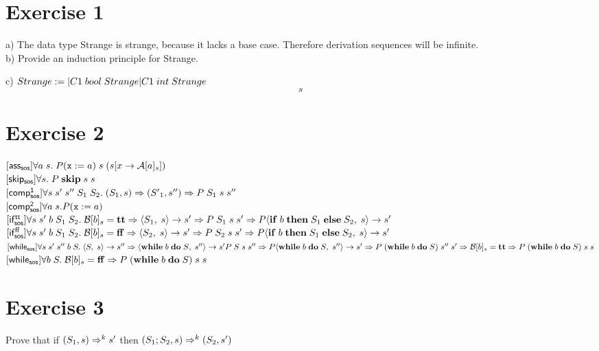 \documentclass[a4paper]{paper}
\begin{document}
\section*{Exercise 1}

a) The data type Strange is strange, because it lacks a base case. Therefore derivation sequences will be infinite. \\

b) Provide an induction principle for Strange.

c)
$Strange :=\\
| C1\;bool\;Strange\\
| C1\;int\;Strange\\
$
$$s$$

\section*{Exercise 2}


$\rasssos \forall a\;s.\;P(\cass x a)\;s\;(s[x \rightarrow \aeval a s])$\\

$\rskipsos \forall s.\;P\;\cskip\;s\;s$\\

$\rcompasos \forall s\;s'\;{s''}\;{S_1}\;{S_2}.\;(S_1, s) \dev ({{S'}_1}, s'') \dev P\;S_1\;s\;s''$\\

$\rcompbsos \forall a\;s. P(\cass x a)$\\

$\rifttsos \forall s\;s'\;b\;{S_1}\;{S_2}.\;\beval b s = \ltrue \dev {\ns {S_1} s {s'}} \dev P\;{S_1}\;s\;s' \dev P \ns {\cif b {S_1} {S_2}} s s'$\\

$\rifffsos \forall s\;s'\;b\;{S_1}\;{S_2}.\;\beval b s = \lfalse \dev {\ns {S_2} s {s'}} \dev P\;{S_2}\;s\;s' \dev P \ns {\cif b {S_1} {S_2}} s s'$\\

$\rwhilesos \forall s\;s'\;s''\;b\;S.\;{\ns S s {s''}} \dev { \ns{\cwhile b S} {s''} s'}\\
P\;S\;s\;{s''} \dev P \ns {\cwhile b S} {s''} {s'} \dev P\;(\cwhile b S)\;{s''}\;{s'} \dev \beval b s = \ltrue \dev P\;(\cwhile b S)\;s\;s$\\

$\rwhilesos \forall b\;S.\;\beval b s = \lfalse \dev P\;(\cwhile b S)\;s\;s
$\\

\section*{Exercise 3}
Prove that if $(S_1, s) \devk k s'$ then $(S_1;S_2, s) \devk k (S_2, s')$
\end{document}
